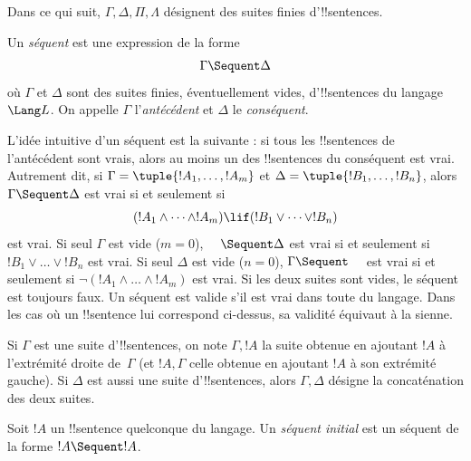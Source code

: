 \documentclass[../../../include/open-logic-section]{subfiles}
\begin{document}
      {}
      {}


Dans ce qui suit, $\Gamma, \Delta, \Pi, \Lambda$ désignent des suites
finies d'!!{sentence}s.

\begin{defn}[Séquent]
Un \emph{séquent} est une expression de la forme
\[
\Gamma \Sequent \Delta
\]
où $\Gamma$ et $\Delta$ sont des suites finies, éventuellement vides,
d'!!{sentence}s du langage $\Lang L$. On appelle $\Gamma$
l'\emph{antécédent} et $\Delta$ le \emph{conséquent}.
\end{defn}

\begin{explain}
L'idée intuitive d'un séquent est la suivante : si tous les
!!{sentence}s de l'antécédent sont vrais, alors au moins un des
!!{sentence}s du conséquent est vrai. Autrement dit, si
$\Gamma = \tuple{!A_1, \dots, !A_m}$ et
$\Delta = \tuple{!B_1, \dots, !B_n}$, alors
$\Gamma \Sequent \Delta$ est vrai si et seulement si
\[
(!A_1 \land \cdots \land !A_m) \lif (!B_1 \lor \cdots \lor
!B_n)
\]
est vrai. Si seul $\Gamma$ est vide ($m = 0$), $\quad \Sequent \Delta$
est vrai si et seulement si $!B_1 \lor \dots \lor !B_n$ est vrai.
Si seul $\Delta$ est vide ($n = 0$), $\Gamma \Sequent \quad$ est vrai
si et seulement si $\lnot(!A_1 \land \dots \land !A_m)$ est vrai.
Si les deux suites sont vides, le séquent est toujours faux.
Un séquent est valide s'il est vrai dans toute
 du langage. Dans les cas où un
!!{sentence} lui correspond ci-dessus, sa validité équivaut à la sienne.
\end{explain}

Si $\Gamma$ est une suite d'!!{sentence}s, on note $\Gamma, !A$
la suite obtenue en ajoutant $!A$ à l'extrémité droite de~$\Gamma$
(et $!A, \Gamma$ celle obtenue en ajoutant $!A$ à son extrémité
gauche). Si $\Delta$ est aussi une suite d'!!{sentence}s, alors
$\Gamma, \Delta$ désigne la concaténation des deux suites.

\begin{defn}
Soit $!A$ un !!{sentence} quelconque du langage.
Un \emph{séquent initial} est un séquent
{de la forme $!A \Sequent !A$.}
\end{defn}
\end{document}
